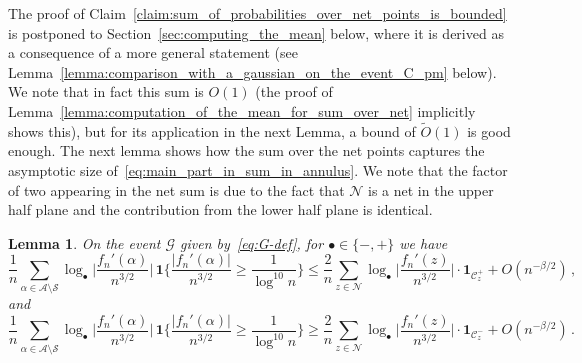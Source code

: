 \documentclass[11pt]{amsart}
\newtheorem{lemma}[theorem]{Lemma}
\theoremstyle{remark}
\theoremstyle{definition}
\newcommand{\cA}{\mathcal A}
\newcommand{\cC}{\mathcal C}
\newcommand{\cN}{\mathcal N}
\newcommand{\cG}{\mathcal G}
\newcommand{\one}{\boldsymbol{1}}
\begin{document}
    The proof of Claim~\ref{claim:sum_of_probabilities_over_net_points_is_bounded} is postponed to Section~\ref{sec:computing_the_mean} below, where it is derived as a consequence of a more general statement (see Lemma~\ref{lemma:comparison_with_a_gaussian_on_the_event_C_pm} below). We note that in fact this sum is $O(1)$ (the proof of Lemma~\ref{lemma:computation_of_the_mean_for_sum_over_net} implicitly shows this), but for its application in the next Lemma, a bound of $\widetilde{O}(1)$ is good enough. The next lemma shows how the sum over the net points captures the asymptotic size of~\eqref{eq:main_part_in_sum_in_annulus}.  We note that the factor of two appearing in the net sum is due to the fact that $\cN$ is a net in the upper half plane and the contribution from the lower half plane is identical.

    \begin{lemma}\label{lemma:two_sided_bound_roots_vs_net}
    On the event $\cG$ given by~\eqref{eq:G-def}, for $\bullet \in \{-,+\}$ we have 
      \begin{equation*}
          \frac{1}{n} \sum_{\alpha \in \cA\setminus \mathcal{S}} \log_\bullet \Big|\frac{f_n'(\alpha)}{n^{3/2}} \Big| \, \one\Big\{\frac{|f_n'(\alpha)|}{n^{3/2}} \geq \frac{1}{\log^{10}n}  \Big\} \leq \frac{2}{n} \sum_{z \in \cN} \log_\bullet \Big|\frac{f_n'(z)}{n^{3/2}} \Big| \cdot \one_{\cC_z^+} + O(n^{-\beta/2}) \, ,
      \end{equation*}  
      and \begin{equation*}
\frac{1}{n} \sum_{\alpha \in \cA\setminus \mathcal{S}} \log_\bullet\Big|\frac{f_n'(\alpha)}{n^{3/2}} \Big| \,  \one\Big\{\frac{|f_n'(\alpha)|}{n^{3/2}} \geq \frac{1}{\log^{10}n}  \Big\} \geq \frac{2}{n} \sum_{z \in \cN}  \log_\bullet\Big|\frac{f_n'(z)}{n^{3/2}} \Big| \cdot  \one_{\cC_z^-} + O(n^{-\beta/2})\,.
      \end{equation*}
    \end{lemma}    
\end{document}
